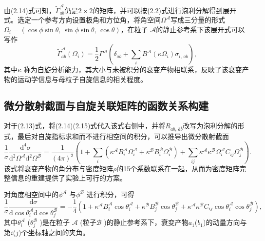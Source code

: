 由(2.14)式可知，$\tilde{\Gamma}_{ab}^{ \mathcal{A}}$仍是$2\times 2$的矩阵，并可以按(2.2)式进行泡利分解得到展开式。选定一个参考方向设置极角和方位角，将角空间$\Omega^{ \mathcal{A}}$写成三分量的形式$\Omega_i=(\cos  \phi \sin \theta \text{, }\sin \phi \sin \theta \text{, }\cos  \theta )$，在粒子 $\mathcal{A}$的静止参考系下该展开式可以写作\cite{ref8}
\begin{equation*}
\tilde{\Gamma}_{ab}^{\mathcal{A}}(\Omega_i)=\frac{1}{2} \Gamma^{\mathcal{A}} (\delta_{ab} +\sum_{i} B^{\mathcal{A}} (\kappa \Omega_i )\sigma_{i\text{, }ab})\text{,}
\tag{2.15}
\end{equation*}
\noindent 其中$\kappa$ 称为自旋分析能力，其大小与未被积分的衰变产物相联系，反映了该衰变产物的运动学信息与母粒子自旋信息的相关程度。
\newpage
\subsection{微分散射截面与自旋关联矩阵的函数关系构建}
\label{sec:twoptwopthree}
对于(2.13)式，将(2.14)(2.15)式代入该式右侧中，并将$R_{ab\text{, }\overline{a} \overline{b}}$改写为泡利分解的形式，最后对自旋指标求和而不进行相空间的积分，可以推导出微分散射截面
\begin{equation*}
\frac{1}{\sigma} \frac{\text{d}^4\sigma}{\text{d}^2\Omega^{\mathcal{A}} \text{d}^2\Omega^{\mathcal{B}}}=\frac{1}{(4\pi )^2} (1+\sum_i (\kappa^{\mathcal{A}} B_i^{\mathcal{A}} \Omega_i^{\mathcal{A}} + \kappa^{\mathcal{B}} B_i^{\mathcal{B}} \Omega_i^{\mathcal{B}})+\sum_{ij} \kappa^{\mathcal{A}} \kappa^{\mathcal{B}} \Omega_i^{\mathcal{A}} C_{ij} \Omega_j^{\mathcal{B}})\text{.}
\tag{2.16}
\end{equation*}
\noindent 该式将衰变产物的角分布与密度矩阵$\rho$的15个系数联系在一起，从而为密度矩阵完整信息的重建提供了实验上可行的方案。

对角度相空间中的$\phi^ \mathcal{A} $ 与$\phi^ \mathcal{B} $ 进行积分，可得
\begin{equation*}
\frac{1}{\sigma} \frac{ \text{d}\sigma}{ \text{d} \cos   \theta_i^ \mathcal{A}    \text{d}\cos   \theta_j^ \mathcal{B}  }= -\frac{1}{4} (1+\kappa^ \mathcal{A}   B_i^ \mathcal{A}   \cos  \theta_{i}^{ \mathcal{A}  } + \kappa^ \mathcal{B}   B_j^ \mathcal{B}   \cos  \theta_{j}^{ \mathcal{B}  } + \kappa^ \mathcal{A}   \kappa^ \mathcal{B}   C_{ij} \cos  \theta_{i}^{ \mathcal{A}  } \cos  \theta_{j}^{ \mathcal{B}  } )\text{,}
\tag{2.17}
\end{equation*}
\noindent 其中$\theta_{i}^{ \mathcal{A}  }$ ($\theta_{j}^{ \mathcal{B}  }$ )是在粒子 $\mathcal{A}$  (粒子$ \mathcal{B}$  )的静止参考系下，衰变产物$a_1$($b_1$)的动量方向与第$i$($j$)个坐标轴之间的夹角。

